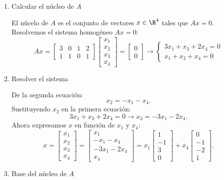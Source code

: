 \begin{enumerate}[label=\color{red}\textbf{\arabic*)}]
    \begin{enumerate}[label=Paso \arabic*:]
        \item Calcular el núcleo de $A$

            El núcelo de  $A$ es el conjunto de vectores $x \in \R^4$ tales que $Ax=0$. Resolvemos el sistema homogéneo  $Ax=0$:  \[
            Ax=\begin{bmatrix} 
                3 & 0 & 1 & 2\\
                1 & 1 & 0 & 1
            \end{bmatrix} \begin{bmatrix} 
            x_1\\ x_2\\ x_3\\ x_4 
            \end{bmatrix} =\begin{bmatrix} 
            0\\ 0 
            \end{bmatrix} \longrightarrow \begin{cases}
                3x_1+x_3+2x_4=0\\
                x_1+x_2+x_4=0
            \end{cases}
            \] 
        \item Resolver el sistema

            De la segunda ecuación: \[
            x_2=-x_1-x_4.
            \] 
            Sustituyendo $x_2$ en la primera ecuación: \[
            3x_1+x_3+2x_4=0\longrightarrow x_3=-3x_1-2x_4.
            \] 
            Ahora expresamos $x$ en función de $x_1$ y $x_4$: \[
            x=\begin{bmatrix} 
            x_1\\ x_2\\x_3\\x_4 
            \end{bmatrix} =\begin{bmatrix} 
            x_1\\ -x_1-x_4\\-3x_1-2x_4\\x_4 
            \end{bmatrix}=x_1\begin{bmatrix} 
            1\\-1\\3\\0 
            \end{bmatrix}+x_4\begin{bmatrix} 
            0\\-1\\-2\\1 
            \end{bmatrix}.
            \] 
        \item Base del núcleo de $A$


\end{enumerate}
\end{enumerate}
